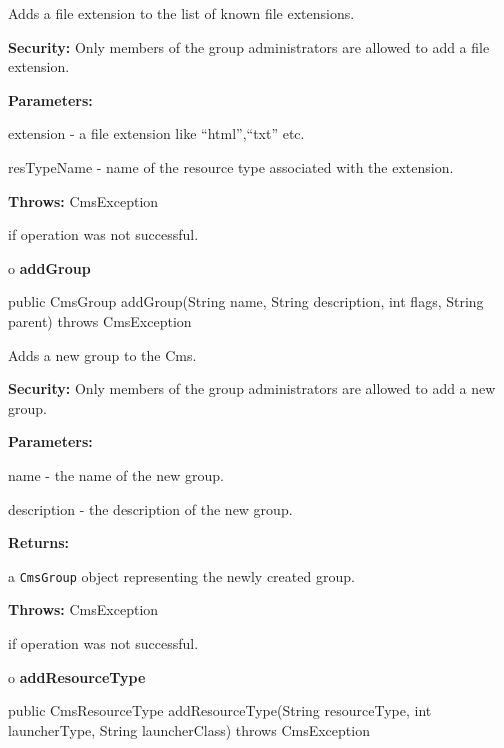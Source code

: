 \begin{description}
\htmlDD Adds a file extension to the list of known file extensions. 

{\bf Security:} Only members of the group administrators are allowed to add a
file extension. 

\begin{description}
\item {\bf Parameters:}  

extension - a file extension like ``html'',``txt'' etc.  

resTypeName - name of the resource type associated with the extension.  
\item {\bf Throws:} CmsException  

if operation was not successful.  
\end{description}

\end{description}

o {\bf addGroup} 

\begin{PRE}
 public CmsGroup addGroup(String name,
                          String description,
                          int flags,
                          String parent) throws CmsException
\end{PRE}

\begin{description}
\htmlDD Adds a new group to the Cms. 

{\bf Security:} Only members of the group administrators are allowed to add a
new group. 

\begin{description}
\item {\bf Parameters:}  

name - the name of the new group.  

description - the description of the new group.  
\item {\bf Returns:}  

a {\tt CmsGroup} object representing the newly created group.  
\item {\bf Throws:} CmsException  

if operation was not successful.  
\end{description}

\end{description}

o {\bf addResourceType} 

\begin{PRE}
 public CmsResourceType addResourceType(String resourceType,
                                        int launcherType,
                                        String launcherClass) throws CmsException
\end{PRE}

